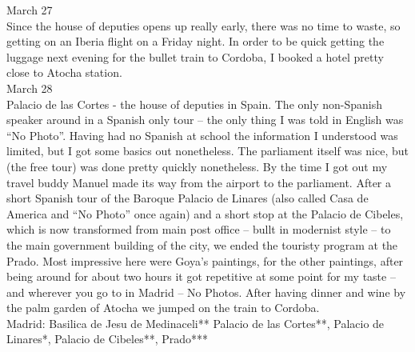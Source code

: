 March 27\\
Since the house of deputies opens up really early, there was no time to waste, so getting on an Iberia flight on a Friday night. In order to be quick getting the luggage next evening for the bullet train to Cordoba, I booked a hotel pretty close to Atocha station.\\

March 28\\
Palacio de las Cortes - the house of deputies in Spain. The only non-Spanish speaker around in a Spanish only tour -- the only thing I was told in English was ``No Photo''. Having had no Spanish at school the information I understood was limited, but I got some basics out nonetheless. The parliament itself was nice, but (the free tour) was done pretty quickly nonetheless. By the time I got out my travel buddy Manuel made its way from the airport to the parliament. After a short Spanish tour of the Baroque Palacio de Linares (also called Casa de America and ``No Photo'' once again) and a short stop at the Palacio de Cibeles, which is now transformed from main post office -- bullt in modernist style -- to the main government building of the city, we ended the touristy program at the Prado. Most impressive here were Goya's paintings, for the other paintings, after being around for about two hours it got repetitive at some point for my taste -- and wherever you go to in Madrid -- No Photos. After having dinner and wine by the palm garden of Atocha we jumped on the train to Cordoba.\\

Madrid:
Basilica de Jesu de Medinaceli**
Palacio de las Cortes**,
Palacio de Linares*,
Palacio de Cibeles**,
Prado***\\

